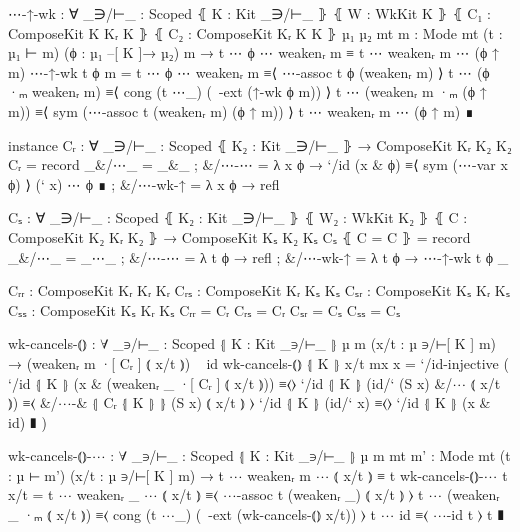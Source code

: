 \begin{code}
      ⋯-↑-wk :
        ∀ {_∋/⊢_ : Scoped} ⦃ K : Kit _∋/⊢_ ⦄ ⦃ W : WkKit K ⦄
          ⦃ C₁ : ComposeKit K Kᵣ K ⦄ ⦃ C₂ : ComposeKit Kᵣ K K ⦄ 
          {µ₁ µ₂ mt} {m : Mode mt} (t : µ₁ ⊢ m) (ϕ : µ₁ –[ K ]→ µ₂) m
        → t ⋯ ϕ ⋯ weakenᵣ m ≡ t ⋯ weakenᵣ m ⋯ (ϕ ↑ m)
      ⋯-↑-wk t ϕ m =
        t ⋯ ϕ ⋯ weakenᵣ m          ≡⟨ ⋯-assoc t ϕ (weakenᵣ m) ⟩
        t ⋯ (ϕ ·ₘ weakenᵣ m)       ≡⟨ cong (t ⋯_) (~-ext (↑-wk ϕ m)) ⟩
        t ⋯ (weakenᵣ m ·ₘ (ϕ ↑ m)) ≡⟨ sym (⋯-assoc t (weakenᵣ m) (ϕ ↑ m)) ⟩
        t ⋯ weakenᵣ m ⋯ (ϕ ↑ m)    ∎

      instance
        Cᵣ : ∀ {_∋/⊢_ : Scoped} ⦃ K₂ : Kit _∋/⊢_ ⦄
             → ComposeKit Kᵣ K₂ K₂
        Cᵣ = record
          { _&/⋯_ = _&_
          ; &/⋯-⋯ = λ x ϕ →
            `/id (x & ϕ) ≡⟨ sym (⋯-var x ϕ) ⟩
            (` x) ⋯ ϕ    ∎
          ; &/⋯-wk-↑ = λ x ϕ → refl
          }

        Cₛ : ∀ {_∋/⊢_ : Scoped} ⦃ K₂ : Kit _∋/⊢_ ⦄ ⦃ W₂ : WkKit K₂ ⦄ ⦃ C : ComposeKit K₂ Kᵣ K₂ ⦄
             → ComposeKit Kₛ K₂ Kₛ
        Cₛ ⦃ C = C ⦄ = record
          { _&/⋯_    = _⋯_
          ; &/⋯-⋯    = λ t ϕ → refl
          ; &/⋯-wk-↑ = λ t ϕ → ⋯-↑-wk t ϕ _
          }

      Cᵣᵣ : ComposeKit Kᵣ Kᵣ Kᵣ
      Cᵣₛ : ComposeKit Kᵣ Kₛ Kₛ
      Cₛᵣ : ComposeKit Kₛ Kᵣ Kₛ
      Cₛₛ : ComposeKit Kₛ Kᵣ Kₛ
      Cᵣᵣ = Cᵣ
      Cᵣₛ = Cᵣ
      Cₛᵣ = Cₛ
      Cₛₛ = Cₛ

      wk-cancels-⦅⦆ :
        ∀ {_∋/⊢_  : Scoped} ⦃ K : Kit _∋/⊢_ ⦄
          {µ m} (x/t : µ ∋/⊢[ K ] m) 
        → (weakenᵣ m ·[ Cᵣ ] ⦅ x/t ⦆) ~ id
      wk-cancels-⦅⦆ ⦃ K ⦄ x/t mx x = `/id-injective (
          `/id ⦃ K ⦄ (x & (weakenᵣ _ ·[ Cᵣ ] ⦅ x/t ⦆)) ≡⟨⟩
          `/id ⦃ K ⦄ (id/` (S x) &/⋯ ⦅ x/t ⦆)          ≡⟨ &/⋯-& ⦃ Cᵣ ⦃ K ⦄ ⦄ (S x) ⦅ x/t ⦆ ⟩
          `/id ⦃ K ⦄ (id/` x)                          ≡⟨⟩
          `/id ⦃ K ⦄ (x & id)                          ∎
        )

      wk-cancels-⦅⦆-⋯ :
        ∀ {_∋/⊢_  : Scoped} ⦃ K : Kit _∋/⊢_ ⦄
          {µ m mt} {m' : Mode mt} (t : µ ⊢ m') (x/t : µ ∋/⊢[ K ] m) 
        → t ⋯ weakenᵣ m ⋯ ⦅ x/t ⦆ ≡ t
      wk-cancels-⦅⦆-⋯ t x/t =
        t ⋯ weakenᵣ _ ⋯ ⦅ x/t ⦆    ≡⟨ ⋯-assoc t (weakenᵣ _) ⦅ x/t ⦆ ⟩
        t ⋯ (weakenᵣ _ ·ₘ ⦅ x/t ⦆) ≡⟨ cong (t ⋯_) (~-ext (wk-cancels-⦅⦆ x/t)) ⟩
        t ⋯ id                     ≡⟨ ⋯-id t ⟩
        t                          ∎


\end{code}
